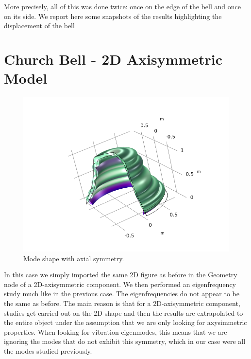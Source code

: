 \documentclass[a4paper]{article}
\begin{document}
More precisely, all of this was done twice: once on the edge of the bell and once on its side. We report here some snapshots of the results highlighting the displacement of the bell

\section{Church Bell - 2D Axisymmetric Model}

\begin{figure}[h!]
	\centering\includegraphics[width=0.75\linewidth]{axisMode.png}
	\caption{Mode shape with axial symmetry.}
	\label{fig:ax}
\end{figure}

In this case we simply imported the same 2D figure as before in the Geometry node of a 2D-axisymmetric component. We then performed an eigenfrequency study much like in the previous case. The eigenfrequencies do not appear to be the same as before. The main reason is that for a 2D-axisymmetric component, studies get carried out on the 2D shape and then the results are extrapolated to the entire object under the assumption that we are only looking for axysimmetric properties. When looking for vibration eigenmodes, this means that we are ignoring the modes that do not exhibit this symmetry, which in our case were all the modes studied previously.
\end{document}
